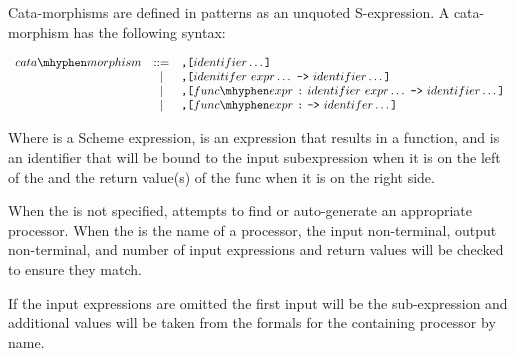 \documentclass[letterpaper,10pt]{article}
\begin{document}
Cata-morphisms are defined in patterns as an unquoted S-expression.  A
cata-morphism has the following syntax:

\[
\begin{array}{rcl}
cata\mhyphen morphism &::=& {\hbox{\tt ,[}}identifier \ldots {\hbox{\tt ]}}\\
&|& {\hbox{\tt ,[}}idenitifer\ expr \ldots\ {\hbox{\tt ->}}\ identifier \ldots {\hbox{\tt ]}}\\
&|& {\hbox{\tt ,[}}func\mhyphen expr\ {\hbox{\tt :}}\ identifier\ expr \ldots\ {\hbox{\tt ->}}\ identifier \ldots {\hbox{\tt ]}}\\
&|& {\hbox{\tt ,[}}func\mhyphen expr\ {\hbox{\tt :}}\ {\hbox{\tt ->}}\ identifer \ldots {\hbox{\tt ]}}\\
\end{array}
\]

Where  is a Scheme expression,  is an expression that
results in a function, and  is an identifier that will be bound
to the input subexpression when it is on the left of the \scheme{-} and the return
value(s) of the func when it is on the right side.

When the  is not specified,  attempts to find or
auto-generate an appropriate processor.  When the  is the name of
a processor, the input non-terminal, output non-terminal, and number of input
expressions and return values will be checked to ensure they match.

If the input expressions are omitted the first input will be the sub-expression
and additional values will be taken from the formals for the containing
processor by name.
\end{document}
